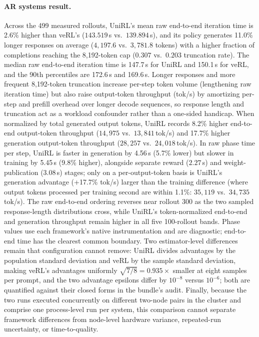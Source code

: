 \documentclass[10pt]{article}
\begin{document}
\paragraph{AR systems result.}
Across the 499 measured rollouts, UniRL's mean raw end-to-end iteration time is 2.6\% higher than veRL's ($143.519$\,s vs.\ $139.894$\,s), and its policy generates 11.0\% longer responses on average ($4{,}197.6$ vs.\ $3{,}781.8$ tokens) with a higher fraction of completions reaching the 8,192-token cap ($0.307$ vs.\ $0.203$ truncation rate).
The median raw end-to-end iteration time is 147.7\,s for UniRL and 150.1\,s for veRL, and the 90th percentiles are 172.6\,s and 169.6\,s.
Longer responses and more frequent 8,192-token truncation increase per-step token volume (lengthening raw iteration time) but also raise output-token throughput (tok/s) by amortizing per-step and prefill overhead over longer decode sequences, so response length and truncation act as a workload confounder rather than a one-sided handicap.
When normalized by total generated output tokens, UniRL records 8.2\% higher end-to-end output-token throughput ($14{,}975$ vs.\ $13{,}841$\,tok/s) and 17.7\% higher generation output-token throughput ($28{,}257$ vs.\ $24{,}018$\,tok/s).
In raw phase time per step, UniRL is faster in generation by 4.56\,s (5.7\% lower) but slower in training by 5.45\,s (9.8\% higher), alongside separate reward ($2.27$\,s) and weight-publication ($3.08$\,s) stages; only on a per-output-token basis is UniRL's generation advantage (+17.7\% tok/s) larger than the training difference (where output tokens processed per training second are within 1.1\%: $35{,}119$ vs.\ $34{,}735$\,tok/s).
The raw end-to-end ordering reverses near rollout 300 as the two sampled response-length distributions cross, while UniRL's token-normalized end-to-end and generation throughput remain higher in all five 100-rollout bands.
Phase values use each framework's native instrumentation and are diagnostic; end-to-end time has the clearest common boundary.
Two estimator-level differences remain that configuration cannot remove: UniRL divides advantages by the population standard deviation and veRL by the sample standard deviation, making veRL's advantages uniformly $\sqrt{7/8}=0.935\times$ smaller at eight samples per prompt, and the two advantage epsilons differ by $10^{-8}$ versus $10^{-6}$; both are quantified against their closed forms in the bundle's audit.
Finally, because the two runs executed concurrently on different two-node pairs in the cluster and comprise one process-level run per system, this comparison cannot separate framework differences from node-level hardware variance, repeated-run uncertainty, or time-to-quality.
\end{document}
